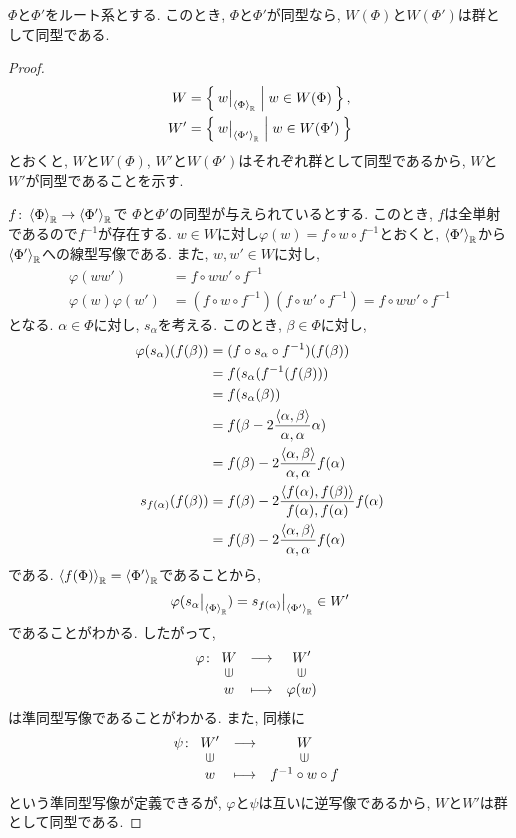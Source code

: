 \begin{prop}
  $\Phi$と$\Phi'$をルート系とする.
  このとき, $\Phi$と$\Phi'$が同型なら,
  $W(\Phi)$と$W(\Phi')$は群として同型である.
\end{prop}
\begin{proof}
  \begin{align*}
  W&=\Set{w\bigr|_{\Braket{\Phi}_{\mathbb{R}}}|w\in W(\Phi)},\\
  W'&=\Set{w\bigr|_{\Braket{\Phi'}_{\mathbb{R}}}|w\in W(\Phi')}
  \end{align*}
  とおくと, $W$と$W(\Phi)$, $W'$と$W(\Phi')$はそれぞれ群として同型であるから,
  $W$と$W'$が同型であることを示す.

  $f\colon \Braket{\Phi}_{\mathbb{R}} \to \Braket{\Phi'}_{\mathbb{R}}$で
  $\Phi$と$\Phi'$の同型が与えられているとする.
  このとき,
  $f$は全単射であるので$f^{-1}$が存在する.
  $w\in W$に対し$\varphi(w)=f\circ w \circ f^{-1}$とおくと,
  $\Braket{\Phi'}_{\mathbb{R}}$から
  $\Braket{\Phi'}_{\mathbb{R}}$への線型写像である.
  また,
  $w,w'\in W$に対し,
  \begin{align*}
    \varphi(ww')&=f\circ ww' \circ f^{-1}\\
    \varphi(w)\varphi(w')&=(f\circ w\circ f^{-1})(f\circ w' \circ f^{-1})
    =f\circ ww' \circ f^{-1}
  \end{align*}
  となる.
  $\alpha\in \Phi$に対し, $s_\alpha$を考える.
  このとき, $\beta\in\Phi$に対し,
  \begin{align*}
    \varphi(s_{\alpha})(f(\beta))
    &=(f\circ s_\alpha \circ f^{-1})(f(\beta))\\
    &=f(s_\alpha  (f^{-1}(f(\beta)))\\
    &=f(s_\alpha(\beta))\\
    &=f(\beta - 2\frac{\Braket{\alpha,\beta}}{\alpha,\alpha}\alpha)\\
    &=f(\beta) - 2\frac{\Braket{\alpha,\beta}}{\alpha,\alpha}f(\alpha)\\
    s_{f(\alpha)}(f(\beta))
    &=f(\beta) - 2\frac{\Braket{f(\alpha),f(\beta)}}{f(\alpha),f(\alpha)}f(\alpha)\\
    &=f(\beta) - 2\frac{\Braket{\alpha,\beta}}{\alpha,\alpha}f(\alpha)
  \end{align*}
  である.
  $\Braket{f(\Phi)}_{\mathbb{R}}=\Braket{\Phi'}_{\mathbb{R}}$であることから,
  \begin{align*}
    \varphi(s_\alpha\bigr|_{\Braket{\Phi}_{\mathbb{R}}})=s_{f(\alpha)}\bigr|_{\Braket{\Phi'}_{\mathbb{R}}}\in W'
  \end{align*}
  であることがわかる.
  したがって,
  \begin{align*}
    \varphi\colon
    \Shazo{W}{W'}
          {w}{\varphi(w)}
  \end{align*}
  は準同型写像であることがわかる.
  また, 同様に
  \begin{align*}
    \psi\colon
    \Shazo{W'}{W}
          {w}{f^{-1}\circ w \circ f}
  \end{align*}
  という準同型写像が定義できるが,
  $\varphi$と$\psi$は互いに逆写像であるから,
  $W$と$W'$は群として同型である.
\end{proof}

